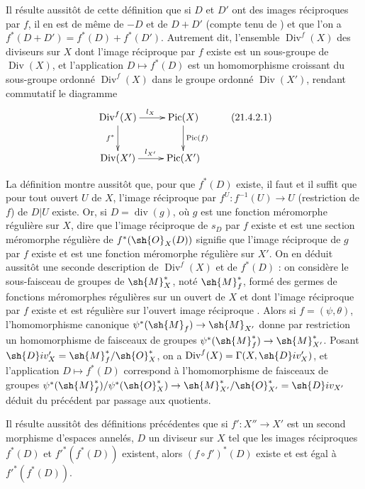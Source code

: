 Il résulte aussitôt de cette définition que si $D$ et $D'$ ont des images réciproques par $f$, il en est de même de $-D$ et de $D+D'$ (compte tenu de ) et que l'on a
$f^*(D+D')=f^*(D)+f^*(D')$.
Autrement dit, l'ensemble $\operatorname{Div}^f(X)$ des diviseurs sur $X$ dont l'image réciproque par $f$ existe est un sous-groupe de $\operatorname{Div}(X)$, et l'application $D\mapsto f^*(D)$ est un homomorphisme croissant du sous-groupe ordonné $\operatorname{Div}^f(X)$ dans le groupe ordonné $\operatorname{Div}(X')$, rendant commutatif le diagramme
\[
\label{IV.21.4.2.1}
  \xymatrix{
    \operatorname{Div}^f(X) \ar[r]^{l_X} \ar[d]_{f^*} & \operatorname{Pic}(X) \ar[d]^{\operatorname{Pic}(f)} \\
    \operatorname{Div}(X') \ar[r]^{l_{X'}} & \operatorname{Pic}(X')
  }
  \tag{21.4.2.1}
\]

\begin{env}[21.4.3]
\label{IV.21.4.3}
La définition  montre aussitôt que, pour que $f^*(D)$ existe, il faut et il suffit que pour tout ouvert $U$ de $X$, l'image réciproque par $f^U:f^{-1}(U)\to U$ (restriction de $f$) de $D|U$ existe.
Or, si $D=\operatorname{div}(g)$, où $g$ est une fonction méromorphe régulière sur $X$, dire que l'image réciproque de $s_D$ par $f$ existe et est une section méromorphe régulière de $f^*(\sh{O}_X(D))$ signifie  que l'image réciproque de $g$ par $f$ existe et est une fonction méromorphe régulière sur $X'$.
On en déduit aussitôt une seconde description de $\operatorname{Div}^f(X)$ et de $f^*(D)$ : on considère le sous-faisceau de groupes de $\sh{M}_X^*$, noté $\sh{M}_f^*$, formé des germes de fonctions méromorphes régulières sur un ouvert de $X$ et dont l'image réciproque par $f$ existe et est régulière sur l'ouvert image réciproque .
Alors si $f=(\psi,\theta)$, l'homomorphisme canonique  $\psi^*(\sh{M}_f)\to\sh{M}_{X'}$ donne par restriction un homomorphisme de faisceaux de groupes $\psi^*(\sh{M}_f^*)\to\sh{M}_{X'}^*$.
Posant $\sh{D}iv_X'=\sh{M}_f^*/\sh{O}_X^*$, on a $\operatorname{Div}^f(X)=\Gamma(X,\sh{D}iv_X')$, et l'application $D\mapsto f^*(D)$ correspond à l'homomorphisme de faisceaux de groupes $\psi^*(\sh{M}_f^*)/\psi^*(\sh{O}_X^*)\to\sh{M}_{X'}^*/\sh{O}_{X'}^*=\sh{D}iv_{X'}$ déduit du précédent par passage aux quotients.
\end{env}

\begin{env}[21.4.4]
\label{IV.21.4.4}
Il résulte aussitôt des définitions précédentes que si $f':X''\to X'$ est un second morphisme d'espaces annelés, $D$ un diviseur sur $X$ tel que les images réciproques $f^*(D)$ et $f'^*(f^*(D))$ existent, alors $(f\circ f')^*(D)$ existe et est égal à $f'^*(f^*(D))$.
\end{env}

